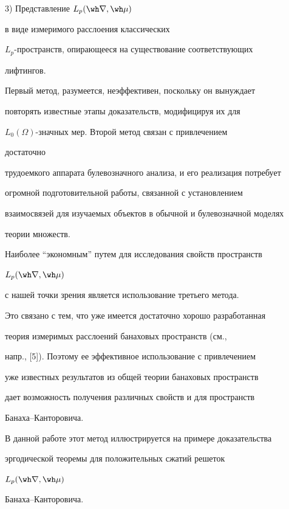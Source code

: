  


3) Представление $L_p(\wh\nabla,\wh\mu)$ 


в виде измеримого расслоения классических 


$L_p$-пространств, опирающееся на существование соответствующих 


лифтингов. 


 


Первый метод, разумеется, неэффективен, поскольку он вынуждает 


повторять известные этапы доказательств, модифицируя их для 


$L_0(\Omega)$-значных мер. Второй метод связан с привлечением 


достаточно 


трудоемкого аппарата булевозначного анализа, и его реализация потребует 


огромной подготовительной работы, связанной с установлением 


взаимосвязей для изучаемых объектов в обычной и булевозначной моделях 


теории множеств. 


 


Наиболее ``экономным'' путем для исследования свойств пространств 


$L_p(\wh\nabla,\wh\mu)$ 


с нашей точки зрения является использование третьего метода. 


Это связано с тем, что уже имеется достаточно хорошо разработанная 


теория измеримых расслоений банаховых пространств (см., 


напр., [5]). Поэтому ее эффективное использование с привлечением 


уже известных результатов из общей теории банаховых пространств 


дает возможность получения различных свойств и для пространств 


Банаха--Канторовича. 


 


В данной работе этот метод иллюстрируется на примере доказательства 


эргодической теоремы для положительных сжатий решеток 


$L_p(\wh\nabla,\wh\mu)$ 


Банаха--Канторовича. 


